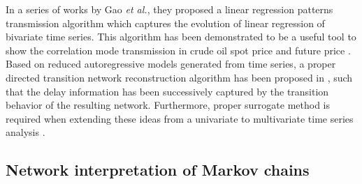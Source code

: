 		In a series of works by Gao \textit{et al.}\cite{Gao2014a,Gao2014,Gao2015}, they proposed a linear regression patterns transmission algorithm which captures the evolution of linear regression of bivariate time series. This algorithm has been demonstrated to be a useful tool to show the correlation mode transmission in crude oil spot price and future price \cite{Huang2015}. Based on reduced autoregressive models generated from time series, a proper directed transition network reconstruction algorithm has been proposed in \cite{Nakamura2012a}, such that the delay information has been successively captured by the transition behavior of the resulting network. Furthermore, proper surrogate method is required when extending these ideas from a univariate to multivariate time series analysis \cite{Nakamura2016}. 
		
		
	\subsection{Network interpretation of Markov chains}

